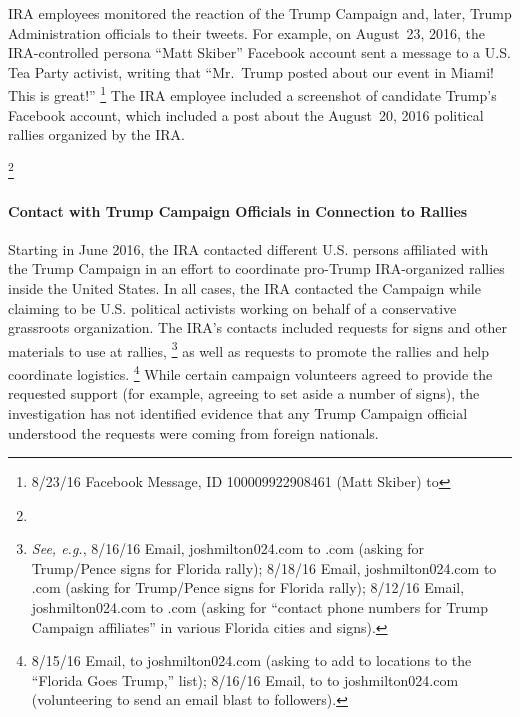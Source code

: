 IRA employees monitored the reaction of the Trump Campaign and, later, Trump Administration officials to their tweets.
For example, on August~23, 2016, the IRA-controlled persona ``Matt Skiber'' Facebook account sent a message to a U.S. Tea Party activist, writing that ``Mr.~Trump posted about our event in Miami! This is great!''%
\footnote{8/23/16 Facebook Message, ID 100009922908461 (Matt Skiber) to }
The IRA employee included a screenshot of candidate Trump's Facebook account, which included a post about the August~20, 2016 political rallies organized by the IRA\null.

\footnote{}

\paragraph{Contact with Trump Campaign Officials in Connection to Rallies}

Starting in June 2016, the IRA contacted different U.S. persons affiliated with the Trump Campaign in an effort to coordinate pro-Trump IRA-organized rallies inside the United States.
In all cases, the IRA contacted the Campaign while claiming to be U.S. political activists working on behalf of a conservative grassroots organization.
The IRA's contacts included requests for signs and other materials to use at rallies,%
\footnote{\textit{See, e.g.}, 8/16/16 Email, joshmilton024\@gmail.com to \@donaldtrump.com (asking for Trump/Pence signs for Florida rally);
8/18/16 Email, joshmilton024\@gmail.com to \@donaldtrump.com (asking for Trump/Pence signs for Florida rally);
8/12/16 Email, joshmilton024\@gmail.com to \@donaldtrump.com (asking for ``contact phone numbers for Trump Campaign affiliates'' in various Florida cities and signs).
}
as well as requests to promote the rallies and help coordinate logistics.%
\footnote{8/15/16 Email,  to joshmilton024\@gmail.com (asking to add to locations to the ``Florida Goes Trump,'' list);
8/16/16 Email, to  to joshmilton024\@gmail.com (volunteering to send an email blast to followers).}
While certain campaign volunteers agreed to provide the requested support (for example, agreeing to set aside a number of signs), the investigation has not identified evidence that any Trump Campaign official understood the requests were coming from foreign nationals.


